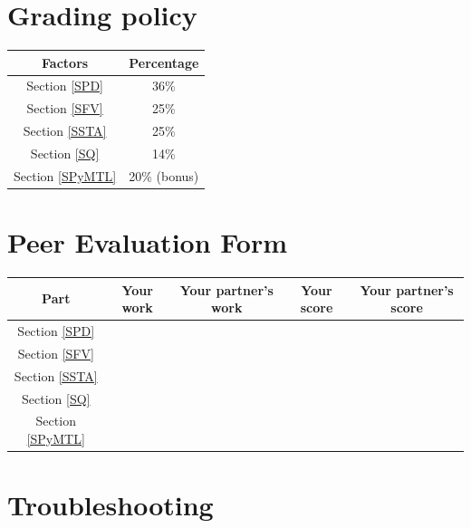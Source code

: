 \documentclass[a4paper,12pt,twoside]{article}
\begin{document}
\section{Grading policy}
\begin{table}[H]
    \centering
    \begin{tabular}{|c|c|}
        \hline
        Factors & Percentage \\
        \hline
        Section \ref{SPD} & 36\%\\
        \hline
        Section \ref{SFV} & 25\% \\
        \hline
        Section \ref{SSTA} & 25\% \\
        \hline
        Section \ref{SQ} & 14\% \\
        \hline
        Section \ref{SPyMTL} & 20\% (bonus) \\
        \hline
    \end{tabular}
\end{table}

\newpage
\appendix
\section{Peer Evaluation Form}
\begin{table}[H]
    \centering
    \begin{tabular}{|c|c|c|c|c|}
        \hline
        Part & Your work & Your partner's work & Your score & Your partner's score \\
        \hline
        Section \ref{SPD} & & & & \\
        \hline
        Section \ref{SFV} & & & & \\
        \hline
        Section \ref{SSTA} & & & & \\
        \hline
        Section \ref{SQ} & & & & \\
        \hline
        Section \ref{SPyMTL} & & & & \\
        \hline
    \end{tabular}
\end{table}
\section{Troubleshooting}
\end{document}
